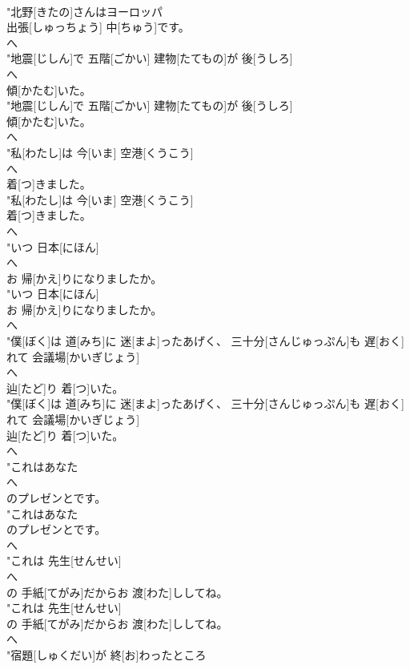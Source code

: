 \documentclass[8pt]{extreport}
\begin{document}
\begin{CJK}{UTF8}{min}
\\	"北野[きたの]さんはヨーロッパ
\\	出張[しゅっちょう] 中[ちゅう]です。
\\	へ
\\	"地震[じしん]で 五階[ごかい] 建物[たてもの]が 後[うしろ]
\\	へ
\\	傾[かたむ]いた。
\\	"地震[じしん]で 五階[ごかい] 建物[たてもの]が 後[うしろ]
\\	傾[かたむ]いた。
\\	へ
\\	"私[わたし]は 今[いま] 空港[くうこう]
\\	へ
\\	着[つ]きました。
\\	"私[わたし]は 今[いま] 空港[くうこう]
\\	着[つ]きました。
\\	へ
\\	"いつ 日本[にほん]
\\	へ
\\	お 帰[かえ]りになりましたか。
\\	"いつ 日本[にほん]
\\	お 帰[かえ]りになりましたか。
\\	へ
\\	"僕[ぼく]は 道[みち]に 迷[まよ]ったあげく、 三十分[さんじゅっぷん]も 遅[おく]れて 会議場[かいぎじょう]
\\	へ
\\	辿[たど]り 着[つ]いた。
\\	"僕[ぼく]は 道[みち]に 迷[まよ]ったあげく、 三十分[さんじゅっぷん]も 遅[おく]れて 会議場[かいぎじょう]
\\	辿[たど]り 着[つ]いた。
\\	へ
\\	"これはあなた
\\	へ
\\	のプレゼンとです。
\\	"これはあなた
\\	のプレゼンとです。
\\	へ
\\	"これは 先生[せんせい]
\\	へ
\\	の 手紙[てがみ]だからお 渡[わた]ししてね。
\\	"これは 先生[せんせい]
\\	の 手紙[てがみ]だからお 渡[わた]ししてね。
\\	へ
\\	"宿題[しゅくだい]が 終[お]わったところ

\end{CJK}
\end{document}
